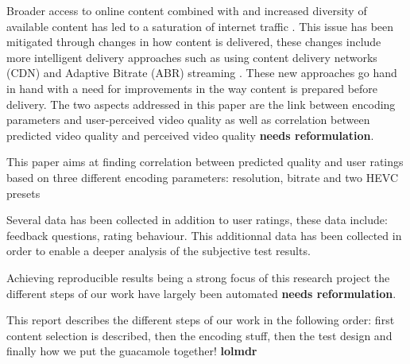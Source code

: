 Broader access to online content \cite{forecast2016cisco} combined with and increased diversity of available content has led to a saturation of internet traffic \cite{sandvine2010global}. This issue has been mitigated through changes in how content is delivered, these changes include more intelligent delivery approaches such as using content delivery networks (CDN)\cite{farber2003internet} and Adaptive Bitrate (ABR) streaming \cite{brueck2010apparatus}. These new approaches go hand in hand with a need for improvements in the way content is prepared before delivery. The two aspects addressed in this paper are the link between encoding parameters and user-perceived video quality as well as correlation between predicted video quality and perceived video quality \textbf{needs reformulation}.

This paper aims at finding correlation between predicted quality and user ratings based on three different encoding parameters: resolution, bitrate and two HEVC presets

Several data has been collected in addition to user ratings, these data include: feedback questions, rating behaviour. This additionnal data has been collected in order to enable a deeper analysis of the subjective test results.

Achieving reproducible results being a strong focus of this research project the different steps of our work have largely been automated \textbf{needs reformulation}.

This report describes the different steps of our work in the following order: first content selection is described, then the encoding stuff, then the test design and finally how we put the guacamole together! \textbf{lolmdr}